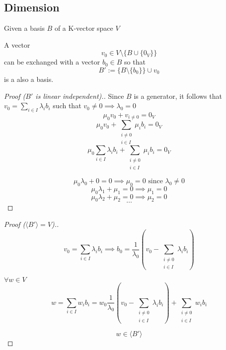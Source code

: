 \subsection{Dimension}
\begin{theorem}\label{thm:small_exchange}
   Given a basis \(B\) of a K-vector space \(V\)

   A vector
   \[v_0 \in V \setminus \{B \cup \{0_V\}\}\]
   can be exchanged with a vector \(b_0 \in B\) so that
   \[B' := \{B \setminus \{b_0\}\} \cup v_0\]
   is a also a basis.
\end{theorem}
\begin{proof}[Proof (\(B'\) is linear independent).]
   Since \(B\) is a generator, it follows that \(v_0 = \sum_{i \in I} \lambda_i b_i\) such that \(v_0 \neq 0 \implies \lambda_0 = 0\)
   \[\mu_0 v_0 + v_{i \neq 0} = 0_V\]
   \[\mu_0 v_0 + \sum_{\substack{i \neq 0\\i \in I}} \mu_i b_i = 0_V\]
   \[\mu_0 \sum_{i \in I} \lambda_i b_i + \sum_{\substack{i \neq 0\\i \in I}} \mu_i b_i = 0_V\]


   \[\mu_0 \lambda_0 + 0 = 0 \implies \mu_0 = 0 \text{ since } \lambda_0 \neq 0\]
   \[\mu_0 \lambda_1 + \mu_1 = 0 \implies \mu_1 = 0\]
   \[\mu_0 \lambda_2 + \mu_2 = 0 \implies \mu_2 = 0\]
   \[\ldots\]
\end{proof}
\begin{proof}[Proof (\(\langle B' \rangle = V\)).]
   \[v_0 = \sum_{i \in I} \lambda_i b_i \implies b_0 = \frac{1}{\lambda_0} \left(v_0 - \sum_{\substack{i \neq 0\\i \in I}} \lambda_i b_i\right)\]

   \(\forall w \in V\)
   \[w = \sum_{i \in I} w_i b_i = w_0 \frac{1}{\lambda_0} \left(v_0 - \sum_{\substack{i \neq 0\\i \in I}} \lambda_i b_i\right) + \sum_{\substack{i \neq 0\\i \in I}} w_i b_i\]

   \[w \in \langle B' \rangle\]
\end{proof}


